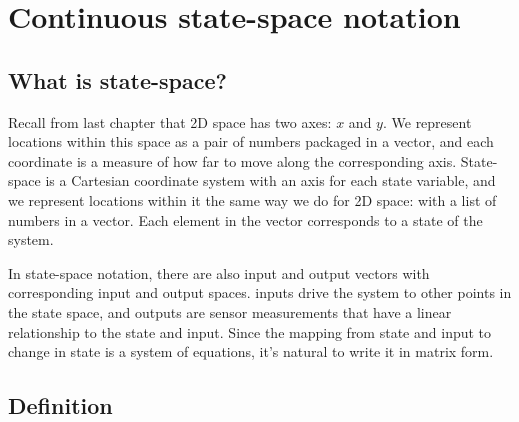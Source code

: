 \section{Continuous state-space notation}

\subsection{What is state-space?}

Recall from last chapter that 2D space has two axes: $x$ and $y$. We represent
locations within this space as a pair of numbers packaged in a vector, and each
coordinate is a measure of how far to move along the corresponding axis.
State-space is a Cartesian coordinate system with an axis for each \gls{state}
variable, and we represent locations within it the same way we do for 2D space:
with a list of numbers in a vector. Each element in the vector corresponds to a
\gls{state} of the \gls{system}.

In state-space notation, there are also \gls{input} and \gls{output} vectors
with corresponding \gls{input} and \gls{output} spaces. \Glspl{input} drive the
\gls{system} to other points in the state space, and \glspl{output} are sensor
measurements that have a linear relationship to the \gls{state} and \gls{input}.
Since the mapping from \gls{state} and \gls{input} to change in \gls{state} is a
system of equations, it's natural to write it in matrix form.

\subsection{Definition}

